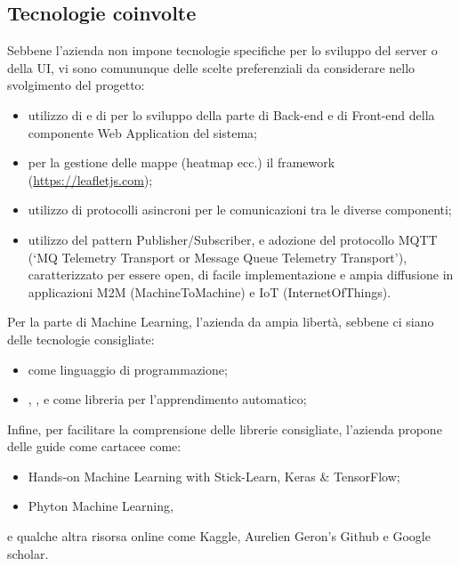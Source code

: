 \subsection{Tecnologie coinvolte}
Sebbene l'azienda non impone tecnologie specifiche per lo sviluppo del server o della UI, vi sono comununque delle scelte preferenziali da considerare nello svolgimento del progetto:
\begin{itemize}
\item utilizzo di  e di  per lo sviluppo della parte di Back-end e di Front-end della componente Web Application del sistema;
\item per la gestione delle mappe (heatmap ecc.) il framework  (\url{https://leafletjs.com});
\item utilizzo di protocolli asincroni per le comunicazioni tra le diverse componenti;
\item utilizzo del pattern Publisher/Subscriber, e adozione del protocollo MQTT (‘MQ Telemetry Transport or Message Queue Telemetry Transport’), caratterizzato per essere open, di facile implementazione e ampia diffusione in applicazioni M2M (MachineToMachine) e IoT (InternetOfThings).
\end{itemize}
Per la parte di Machine Learning, l'azienda da ampia libertà, sebbene ci siano delle tecnologie consigliate:
\begin{itemize}
\item {} come linguaggio di programmazione;
\item {}, ,  e  come libreria per l'apprendimento automatico;
\end{itemize}
Infine, per facilitare la comprensione delle librerie consigliate, l'azienda propone delle guide come cartacee come:
\begin{itemize}
\item Hands-on Machine Learning with Stick-Learn, Keras \& TensorFlow;
\item Phyton Machine Learning,
\end{itemize}
e qualche altra risorsa online come Kaggle, Aurelien Geron's Github e Google scholar.

